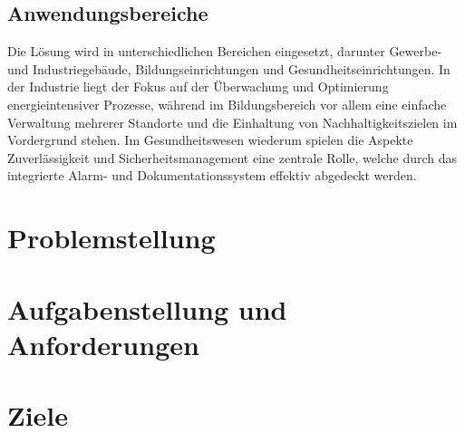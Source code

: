 \subsection{Anwendungsbereiche}

Die Lösung wird in unterschiedlichen Bereichen eingesetzt, darunter Gewerbe- und Industriegebäude, Bildungseinrichtungen und Gesundheitseinrichtungen. In der Industrie liegt der Fokus auf der Überwachung und Optimierung energieintensiver Prozesse, während im Bildungsbereich vor allem eine einfache Verwaltung mehrerer Standorte und die Einhaltung von Nachhaltigkeitszielen im Vordergrund stehen. Im Gesundheitswesen wiederum spielen die Aspekte Zuverlässigkeit und Sicherheitsmanagement eine zentrale Rolle, welche durch das integrierte Alarm- und Dokumentationssystem effektiv abgedeckt werden.

\section{Problemstellung}

\section{Aufgabenstellung und Anforderungen}

\section{Ziele}
